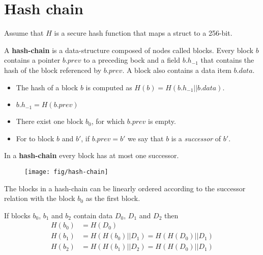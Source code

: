 
\section{Hash chain}

Assume that $H$ is a secure hash function that maps a struct to a 256-bit.

\begin{definition}
A \textbf{hash-chain} is a data-structure composed of nodes called blocks. 
Every block $b$ contains a pointer $b.prev$ to a preceding bock and a field $b.h_{-1}$ 
that contains the hash of the block referenced by $b.prev$.
A block also contains a data item $b.data$.

\begin{itemize}
	\item The hash of a block $b$ is computed as $H(b)= H(b.h_{-1} || b.data)$.
	\item $b.h_{-1}=H(b.prev)$
	\item There exist one block $b_0$, for which $b.prev$ is empty.
	\item For to block $b$ and $b'$, if $b.prev=b'$ we say that $b$ is a \emph{successor} of $b'$.
	
\end{itemize}

In a \textbf{hash-chain} every block has at most one successor.
\end{definition}

\begin{figure}[ht]
	\texttt{[image: fig/hash-chain]}
	
\end{figure}




\begin{lem}
The blocks in a hash-chain can be linearly ordered according to the successor relation with the block $b_0$ as the first block.
\end{lem}


\begin{note}
	If blocks $b_0$, $b_1$ and $b_2$ contain data $D_0$, $D_1$ and $D_2$ then
\begin{align*}
	H(b_0) & = H(D_0)\\
	H(b_1) & = H( H(b_0) || D_1) = H( H(D_0)|| D_1) \\
	H(b_2) & = H( H(b_1) || D_2) = H( H(D_0)|| D_1) \\
\end{align*}

\end{note}

